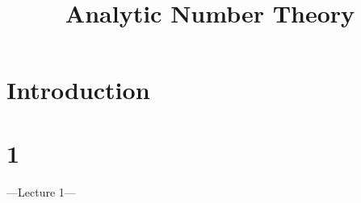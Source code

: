 \documentclass[a4paper]{article}
\begin{document}
\title{Analytic Number Theory}

\maketitle

\newpage

\tableofcontents

\newpage

\section{Introduction}

\newpage

\section{1}

---Lecture 1---
\end{document}
